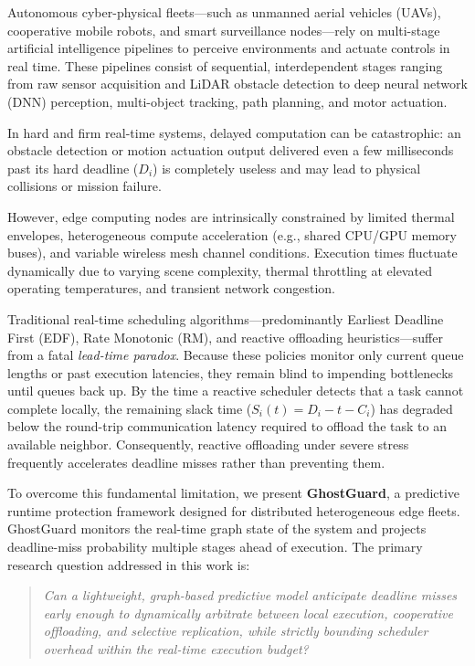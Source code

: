\documentclass[10pt,conference]{IEEEtran}
\begin{document}
Autonomous cyber-physical fleets—such as unmanned aerial vehicles (UAVs), cooperative mobile robots, and smart surveillance nodes—rely on multi-stage artificial intelligence pipelines to perceive environments and actuate controls in real time. These pipelines consist of sequential, interdependent stages ranging from raw sensor acquisition and LiDAR obstacle detection to deep neural network (DNN) perception, multi-object tracking, path planning, and motor actuation.

In hard and firm real-time systems, delayed computation can be catastrophic: an obstacle detection or motion actuation output delivered even a few milliseconds past its hard deadline ($D_i$) is completely useless and may lead to physical collisions or mission failure. 

However, edge computing nodes are intrinsically constrained by limited thermal envelopes, heterogeneous compute acceleration (e.g., shared CPU/GPU memory buses), and variable wireless mesh channel conditions. Execution times fluctuate dynamically due to varying scene complexity, thermal throttling at elevated operating temperatures, and transient network congestion. 

Traditional real-time scheduling algorithms—predominantly Earliest Deadline First (EDF), Rate Monotonic (RM), and reactive offloading heuristics—suffer from a fatal \textit{lead-time paradox}. Because these policies monitor only current queue lengths or past execution latencies, they remain blind to impending bottlenecks until queues back up. By the time a reactive scheduler detects that a task cannot complete locally, the remaining slack time ($S_i(t) = D_i - t - C_i$) has degraded below the round-trip communication latency required to offload the task to an available neighbor. Consequently, reactive offloading under severe stress frequently accelerates deadline misses rather than preventing them.

To overcome this fundamental limitation, we present \textbf{GhostGuard}, a predictive runtime protection framework designed for distributed heterogeneous edge fleets. GhostGuard monitors the real-time graph state of the system and projects deadline-miss probability multiple stages ahead of execution. The primary research question addressed in this work is:
\begin{quote}
\textit{Can a lightweight, graph-based predictive model anticipate deadline misses early enough to dynamically arbitrate between local execution, cooperative offloading, and selective replication, while strictly bounding scheduler overhead within the real-time execution budget?}
\end{quote}
\end{document}
